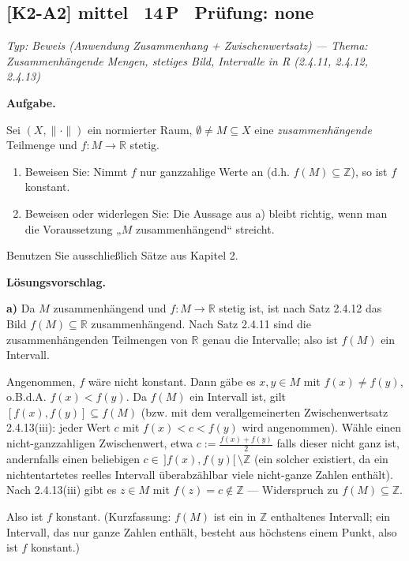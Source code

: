 \documentclass[a4paper,11pt]{article}
\begin{document}
\subsection*{[K2-A2] \normalfont mittel \textbullet\ 14\,P \textbullet\ Pr\"ufung: none}
\textit{Typ: Beweis (Anwendung Zusammenhang + Zwischenwertsatz)  ---  Thema: Zusammenhängende Mengen, stetiges Bild, Intervalle in R (2.4.11, 2.4.12, 2.4.13)}\par\smallskip
\textbf{Aufgabe.}\par
Sei $(X,\|\cdot\|)$ ein normierter Raum, $\emptyset\neq M\subseteq X$ eine \emph{zusammenhängende} Teilmenge und $f:M\to\mathbb{R}$ stetig.

\begin{enumerate}[label=\alph*)]
  \item Beweisen Sie: Nimmt $f$ nur ganzzahlige Werte an (d.h. $f(M)\subseteq\mathbb{Z}$), so ist $f$ konstant.
  \item Beweisen oder widerlegen Sie: Die Aussage aus a) bleibt richtig, wenn man die Voraussetzung „$M$ zusammenhängend“ streicht.
\end{enumerate}
Benutzen Sie ausschließlich Sätze aus Kapitel 2.\par\smallskip
\textbf{L\"osungsvorschlag.}\par
\textbf{a)} Da $M$ zusammenhängend und $f:M\to\mathbb{R}$ stetig ist, ist nach Satz 2.4.12 das Bild $f(M)\subseteq\mathbb{R}$ zusammenhängend. Nach Satz 2.4.11 sind die zusammenhängenden Teilmengen von $\mathbb{R}$ genau die Intervalle; also ist $f(M)$ ein Intervall.

Angenommen, $f$ wäre nicht konstant. Dann gäbe es $x,y\in M$ mit $f(x)\neq f(y)$, o.B.d.A. $f(x)<f(y)$. Da $f(M)$ ein Intervall ist, gilt $[f(x),f(y)]\subseteq f(M)$ (bzw. mit dem verallgemeinerten Zwischenwertsatz 2.4.13(iii): jeder Wert $c$ mit $f(x)<c<f(y)$ wird angenommen). Wähle einen nicht-ganzzahligen Zwischenwert, etwa $c:=\tfrac{f(x)+f(y)}2$ falls dieser nicht ganz ist, andernfalls einen beliebigen $c\in\,]f(x),f(y)[\,\setminus\mathbb{Z}$ (ein solcher existiert, da ein nichtentartetes reelles Intervall überabzählbar viele nicht-ganze Zahlen enthält). Nach 2.4.13(iii) gibt es $z\in M$ mit $f(z)=c\notin\mathbb{Z}$ — Widerspruch zu $f(M)\subseteq\mathbb{Z}$.

Also ist $f$ konstant. (Kurzfassung: $f(M)$ ist ein in $\mathbb{Z}$ enthaltenes Intervall; ein Intervall, das nur ganze Zahlen enthält, besteht aus höchstens einem Punkt, also ist $f$ konstant.)
\end{document}
